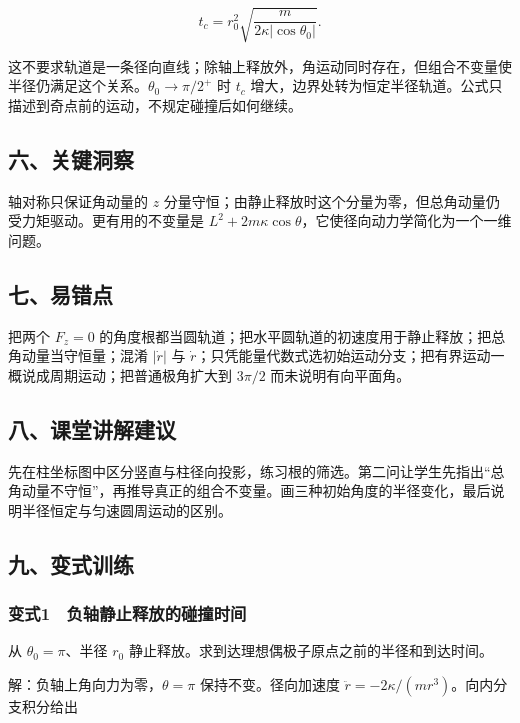 \documentclass[12pt,a4paper,fontset=fandol]{ctexart}
\begin{document}
\[t_c=r_0^2\sqrt{\frac{m}{2\kappa|\cos\theta_0|}}.\]

这不要求轨道是一条径向直线；除轴上释放外，角运动同时存在，但组合不变量使半径仍满足这个关系。\(\theta_0\to\pi/2^+\)
时 \(t_c\)
增大，边界处转为恒定半径轨道。公式只描述到奇点前的运动，不规定碰撞后如何继续。

\subsection{六、关键洞察}\label{ux516dux5173ux952eux6d1eux5bdf-4}

轴对称只保证角动量的 \(z\)
分量守恒；由静止释放时这个分量为零，但总角动量仍受力矩驱动。更有用的不变量是
\(L^2+2m\kappa\cos\theta\)，它使径向动力学简化为一个一维问题。

\subsection{七、易错点}\label{ux4e03ux6613ux9519ux70b9-4}

把两个 \(F_z=0\)
的角度根都当圆轨道；把水平圆轨道的初速度用于静止释放；把总角动量当守恒量；混淆
\(|\dot r|\) 与
\(\dot r\)；只凭能量代数式选初始运动分支；把有界运动一概说成周期运动；把普通极角扩大到
\(3\pi/2\) 而未说明有向平面角。

\subsection{八、课堂讲解建议}\label{ux516bux8bfeux5802ux8bb2ux89e3ux5efaux8bae-4}

先在柱坐标图中区分竖直与柱径向投影，练习根的筛选。第二问让学生先指出``总角动量不守恒''，再推导真正的组合不变量。画三种初始角度的半径变化，最后说明半径恒定与匀速圆周运动的区别。

\subsection{九、变式训练}\label{ux4e5dux53d8ux5f0fux8badux7ec3-4}

\subsubsection{变式1　负轴静止释放的碰撞时间}\label{ux53d8ux5f0f1-ux8d1fux8f74ux9759ux6b62ux91caux653eux7684ux78b0ux649eux65f6ux95f4}

从 \(\theta_0=\pi\)、半径 \(r_0\)
静止释放。求到达理想偶极子原点之前的半径和到达时间。

解：负轴上角向力为零，\(\theta=\pi\) 保持不变。径向加速度
\(\ddot r=-2\kappa/(mr^3)\)。向内分支积分给出
\end{document}
